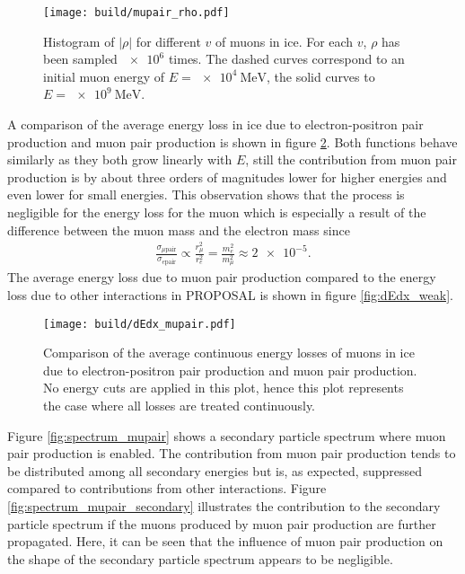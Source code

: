 \begin{figure}
    \centering
    \texttt{[image: build/mupair\_rho.pdf]}
    \caption{Histogram of $\lvert\rho\rvert$ for different $v$ of muons in ice. For each $v$, $\rho$ has been sampled $\num{e6}$ times. The dashed curves correspond to an initial muon energy of $E=\SI{e4}{\mega\electronvolt}$, the solid curves to $E = \SI{e9}{\mega\electronvolt}$.}
    \label{fig:rho_mupair}
\end{figure}

A comparison of the average energy loss in ice due to electron-positron pair production and muon pair production is shown in figure \ref{fig:dEdx_mupair}.
Both functions behave similarly as they both grow linearly with $E$, still the contribution from muon pair production is by about three orders of magnitudes lower for higher energies and even lower for small energies.
This observation shows that the process is negligible for the energy loss for the muon which is especially a result of the difference between the muon mass and the electron mass since 
\begin{align*}
	\frac{\sigma_{\mu \text{pair}}}{\sigma_{e \text{pair}}} \propto \frac{r_{\mu}^2}{r_e^2} = \frac{m_e^2}{m_{\mu}^2} \approx \num{2e-5}.
\end{align*}
The average energy loss due to muon pair production compared to the energy loss due to other interactions in PROPOSAL is shown in figure \ref{fig:dEdx_weak}.

\begin{figure}
    \centering
    \texttt{[image: build/dEdx\_mupair.pdf]}
    \caption{Comparison of the average continuous energy losses of muons in ice due to electron-positron pair production and muon pair production. No energy cuts are applied in this plot, hence this plot represents the case where all losses are treated continuously.}
    \label{fig:dEdx_mupair}
\end{figure}

Figure \ref{fig:spectrum_mupair} shows a secondary particle spectrum where muon pair production is enabled.
The contribution from muon pair production tends to be distributed among all secondary energies but is, as expected, suppressed compared to contributions from other interactions.
Figure \ref{fig:spectrum_mupair_secondary} illustrates the contribution to the secondary particle spectrum if the muons produced by muon pair production are further propagated.
Here, it can be seen that the influence of muon pair production on the shape of the secondary particle spectrum appears to be negligible. 

